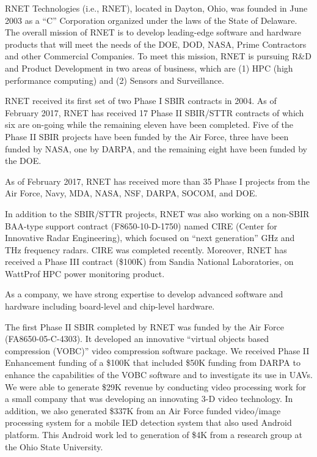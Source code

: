 
RNET Technologies (i.e., RNET), located in Dayton, Ohio, was founded
in June 2003 as a ``C'' Corporation organized under the laws of the
State of Delaware. The overall mission of RNET is to develop
leading-edge software and hardware products that will meet the needs
of the DOE, DOD, NASA, Prime Contractors and other Commercial
Companies. To meet this mission, RNET is pursuing R\&D and Product
Development in two areas of business, which are (1) HPC (high
performance computing) and (2) Sensors and Surveillance.

RNET received its first set of two Phase I SBIR contracts in 2004. As
of February 2017, RNET has received 17 Phase II SBIR/STTR contracts of
which six are on-going while the remaining eleven have been
completed. Five of the Phase II SBIR projects have been funded by the
Air Force, three have been funded by NASA, one by DARPA, and the
remaining eight have been funded by the DOE.

As of February 2017, RNET has received more than 35 Phase I projects
from the Air Force, Navy, MDA, NASA, NSF, DARPA, SOCOM, and DOE.

In addition to the SBIR/STTR projects, RNET was also working on a
non-SBIR BAA-type support contract (F8650-10-D-1750) named CIRE
(Center for Innovative Radar Engineering), which focused on ``next
generation'' GHz and THz frequency radars. CIRE was completed recently. Moreover, RNET has received
a Phase III contract (\$100K) from Sandia National Laboratories, on WattProf HPC 
power monitoring product. 

As a company, we have strong expertise to develop advanced software
and hardware including board-level and chip-level hardware.

The first Phase II SBIR completed by RNET was funded by the Air Force
(FA8650-05-C-4303). It developed an innovative ``virtual objects based
compression (VOBC)'' video compression software package. We received
Phase II Enhancement funding of a \$100K that included \$50K funding
from DARPA to enhance the capabilities of the VOBC software and to
investigate its use in UAVs. We were able to generate \$29K revenue by
conducting video processing work for a small company that was
developing an innovating 3-D video technology. In addition, we also
generated \$337K from an Air Force funded video/image processing system
for a mobile IED detection system that also used Android
platform. This Android work led to generation of \$4K from a research
group at the Ohio State University.

